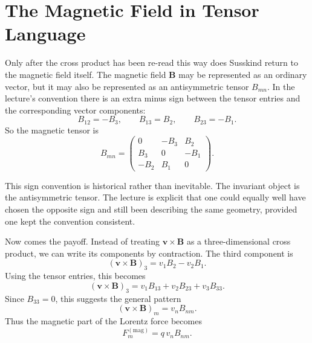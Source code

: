 \section{The Magnetic Field in Tensor Language}

Only after the cross product has been re-read this way does Susskind return to the magnetic field itself. The magnetic field \(\mathbf B\) may be represented as an ordinary vector, but it may also be represented as an antisymmetric tensor \(B_{mn}\). In the lecture's convention there is an extra minus sign between the tensor entries and the corresponding vector components:
\begin{equation}
B_{12}=-B_3,\qquad
B_{13}=B_2,\qquad
B_{23}=-B_1.
\end{equation}
So the magnetic tensor is
\begin{equation}
B_{mn}
=
\begin{pmatrix}
0 & -B_3 & B_2 \\
B_3 & 0 & -B_1 \\
-B_2 & B_1 & 0
\end{pmatrix}.
\end{equation}

\begin{remark}
This sign convention is historical rather than inevitable. The invariant object is the antisymmetric tensor. The lecture is explicit that one could equally well have chosen the opposite sign and still been describing the same geometry, provided one kept the convention consistent.
\end{remark}

Now comes the payoff. Instead of treating \(\mathbf v\times\mathbf B\) as a three-dimensional cross product, we can write its components by contraction. The third component is
\begin{equation}
(\mathbf v\times\mathbf B)_3=v_1B_2-v_2B_1.
\end{equation}
Using the tensor entries, this becomes
\begin{equation}
(\mathbf v\times\mathbf B)_3
=
v_1 B_{13}+v_2 B_{23}+v_3 B_{33}.
\end{equation}
Since \(B_{33}=0\), this suggests the general pattern
\begin{equation}
(\mathbf v\times\mathbf B)_m=v_n B_{nm}.
\end{equation}
Thus the magnetic part of the Lorentz force becomes
\begin{equation}
F_m^{(\mathrm{mag})}=q\,v_n B_{nm}.
\end{equation}

